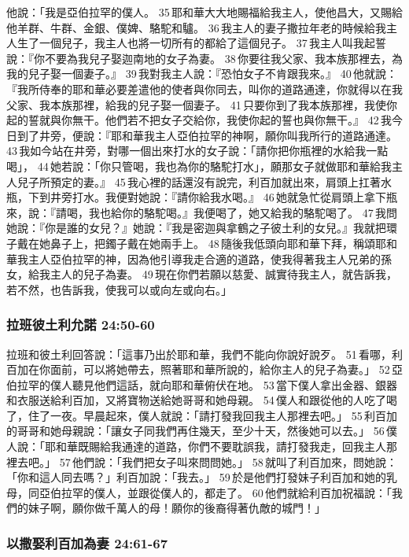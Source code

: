 他說：「我是亞伯拉罕的僕人。 35 耶和華大大地賜福給我主人，使他昌大，又賜給他羊群、牛群、金銀、僕婢、駱駝和驢。 36 我主人的妻子撒拉年老的時候給我主人生了一個兒子，我主人也將一切所有的都給了這個兒子。 37 我主人叫我起誓說：『你不要為我兒子娶迦南地的女子為妻。 38 你要往我父家、我本族那裡去，為我的兒子娶一個妻子。』 39 我對我主人說：『恐怕女子不肯跟我來。』 40 他就說：『我所侍奉的耶和華必要差遣他的使者與你同去，叫你的道路通達，你就得以在我父家、我本族那裡，給我的兒子娶一個妻子。 41 只要你到了我本族那裡，我使你起的誓就與你無干。他們若不把女子交給你，我使你起的誓也與你無干。』 42 我今日到了井旁，便說：『耶和華我主人亞伯拉罕的神啊，願你叫我所行的道路通達。 43 我如今站在井旁，對哪一個出來打水的女子說：「請你把你瓶裡的水給我一點喝」， 44 她若說：「你只管喝，我也為你的駱駝打水」，願那女子就做耶和華給我主人兒子所預定的妻。』 45 我心裡的話還沒有說完，利百加就出來，肩頭上扛著水瓶，下到井旁打水。我便對她說：『請你給我水喝。』 46 她就急忙從肩頭上拿下瓶來，說：『請喝，我也給你的駱駝喝。』我便喝了，她又給我的駱駝喝了。 47 我問她說：『你是誰的女兒？』她說：『我是密迦與拿鶴之子彼土利的女兒。』我就把環子戴在她鼻子上，把鐲子戴在她兩手上。 48 隨後我低頭向耶和華下拜，稱頌耶和華我主人亞伯拉罕的神，因為他引導我走合適的道路，使我得著我主人兄弟的孫女，給我主人的兒子為妻。 49 現在你們若願以慈愛、誠實待我主人，就告訴我，若不然，也告訴我，使我可以或向左或向右。」


\subsubsection{拉班彼土利允諾 24:50-60} 
拉班和彼土利回答說：「這事乃出於耶和華，我們不能向你說好說歹。 51 看哪，利百加在你面前，可以將她帶去，照著耶和華所說的，給你主人的兒子為妻。」 52 亞伯拉罕的僕人聽見他們這話，就向耶和華俯伏在地。 53 當下僕人拿出金器、銀器和衣服送給利百加，又將寶物送給她哥哥和她母親。 54 僕人和跟從他的人吃了喝了，住了一夜。早晨起來，僕人就說：「請打發我回我主人那裡去吧。」 55 利百加的哥哥和她母親說：「讓女子同我們再住幾天，至少十天，然後她可以去。」 56 僕人說：「耶和華既賜給我通達的道路，你們不要耽誤我，請打發我走，回我主人那裡去吧。」 57 他們說：「我們把女子叫來問問她。」 58 就叫了利百加來，問她說：「你和這人同去嗎？」利百加說：「我去。」 59 於是他們打發妹子利百加和她的乳母，同亞伯拉罕的僕人，並跟從僕人的，都走了。 60 他們就給利百加祝福說：「我們的妹子啊，願你做千萬人的母！願你的後裔得著仇敵的城門！」

\subsubsection{以撒娶利百加為妻 24:61-67}

